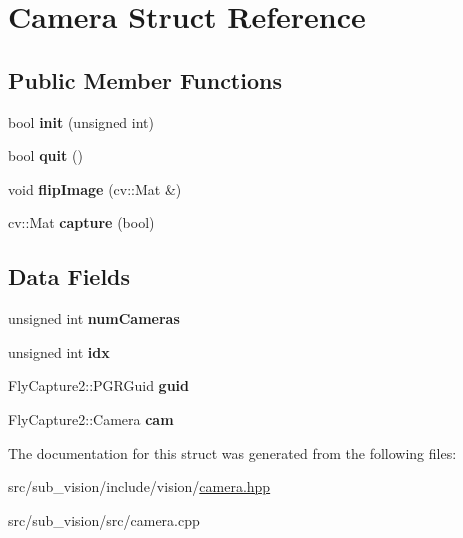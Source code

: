 \hypertarget{structCamera}{}\section{Camera Struct Reference}
\label{structCamera}
\subsection*{Public Member Functions}
\begin{DoxyCompactItemize}
\item 
\mbox{\label{structCamera_abe534466020a7f205f3601df56910355}} 
bool {\bfseries init} (unsigned int)
\item 
\mbox{\label{structCamera_a47b5a859eccd3f9116d6d8711827d97e}} 
bool {\bfseries quit} ()
\item 
\mbox{\label{structCamera_ad1b94205b75a72be4a1404ac89cd7cb7}} 
void {\bfseries flip\+Image} (cv\+::\+Mat \&)
\item 
\mbox{\label{structCamera_a04ffef4242a8badeddda350c23b8a779}} 
cv\+::\+Mat {\bfseries capture} (bool)
\end{DoxyCompactItemize}
\subsection*{Data Fields}
\begin{DoxyCompactItemize}
\item 
\mbox{\label{structCamera_ad3577398f7e9c4befb37c4b1305af9c7}} 
unsigned int {\bfseries num\+Cameras}
\item 
\mbox{\label{structCamera_afa1f437801fc81e7d8b8b6e5d9f91014}} 
unsigned int {\bfseries idx}
\item 
\mbox{\label{structCamera_a64d917f0e75d549935405cc46e4acc87}} 
Fly\+Capture2\+::\+P\+G\+R\+Guid {\bfseries guid}
\item 
\mbox{\label{structCamera_ad69ad787259432ab8cbff8d04c96511a}} 
Fly\+Capture2\+::\+Camera {\bfseries cam}
\end{DoxyCompactItemize}


The documentation for this struct was generated from the following files\+:\begin{DoxyCompactItemize}
\item 
src/sub\+\_\+vision/include/vision/\hyperlink{camera_8hpp}{camera.\+hpp}\item 
src/sub\+\_\+vision/src/camera.\+cpp\end{DoxyCompactItemize}
